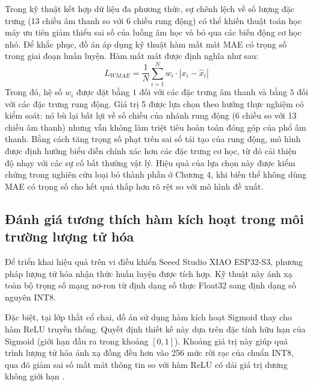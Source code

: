 Trong kỹ thuật kết hợp dữ liệu đa phương thức, sự chênh lệch về số lượng đặc trưng (13 chiều âm thanh so với 6 chiều rung động) có thể khiến thuật toán học máy ưu tiên giảm thiểu sai số của luồng âm học và bỏ qua các biến động cơ học nhỏ. Để khắc phục, đồ án áp dụng kỹ thuật hàm mất mát MAE có trọng số trong giai đoạn huấn luyện. Hàm mất mát được định nghĩa như sau:
\begin{equation}
    L_{WMAE} = \frac{1}{N} \sum_{i=1}^{N} w_i \cdot |x_i - \hat{x}_i|
\end{equation}
Trong đó, hệ số $w_i$ được đặt bằng $1$ đối với các đặc trưng âm thanh và bằng $5$ đối với các đặc trưng rung động. Giá trị 5 được lựa chọn theo hướng thực nghiệm có kiểm soát: nó bù lại bất lợi về số chiều của nhánh rung động (6 chiều so với 13 chiều âm thanh) nhưng vẫn không làm triệt tiêu hoàn toàn đóng góp của phổ âm thanh. Bằng cách tăng trọng số phạt trên sai số tái tạo của rung động, mô hình được định hướng biểu diễn chính xác hơn các đặc trưng cơ học, từ đó cải thiện độ nhạy với các sự cố bất thường vật lý. Hiệu quả của lựa chọn này được kiểm chứng trong nghiên cứu loại bỏ thành phần ở Chương 4, khi biến thể không dùng MAE có trọng số cho kết quả thấp hơn rõ rệt so với mô hình đề xuất.

\subsection{Đánh giá tương thích hàm kích hoạt trong môi trường lượng tử hóa}

Để triển khai hiệu quả trên vi điều khiển Seeed Studio XIAO ESP32-S3, phương pháp lượng tử hóa nhận thức huấn luyện được tích hợp. Kỹ thuật này ánh xạ toàn bộ trọng số mạng nơ-ron từ định dạng số thực Float32 sang định dạng số nguyên INT8.

Đặc biệt, tại lớp thắt cổ chai, đồ án sử dụng hàm kích hoạt Sigmoid thay cho hàm ReLU truyền thống. Quyết định thiết kế này dựa trên đặc tính hữu hạn của Sigmoid (giới hạn đầu ra trong khoảng $[0, 1]$). Khoảng giá trị này giúp quá trình lượng tử hóa ánh xạ đồng đều hơn vào 256 mức rời rạc của chuẩn INT8, qua đó giảm sai số mất mát thông tin so với hàm ReLU có dải giá trị dương không giới hạn \cite{ref_1_14}.

